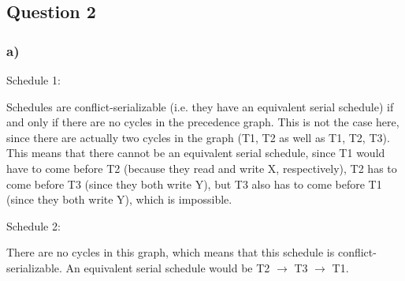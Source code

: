 \documentclass[12pt,a4paper,fleqn]{article}
\begin{document}
\subsection*{Question 2}
\label{sec:qq2}

\subsubsection*{a)}
\noindent Schedule 1:


Schedules are conflict-serializable (i.e. they have an equivalent serial schedule) if and only if there are no cycles in the precedence graph. This is not the case here, since there are actually two cycles in the graph (T1, T2 as well as T1, T2, T3). This means that there cannot be an equivalent serial schedule, since T1 would have to come before T2 (because they read and write X, respectively), T2 has to come before T3 (since they both write Y), but T3 also has to come before T1 (since they both write Y), which is impossible. 

Schedule 2:


There are no cycles in this graph, which means that this schedule is conflict-serializable. An equivalent serial schedule would be T2 $\rightarrow$ T3 $\rightarrow$ T1.
\end{document}
